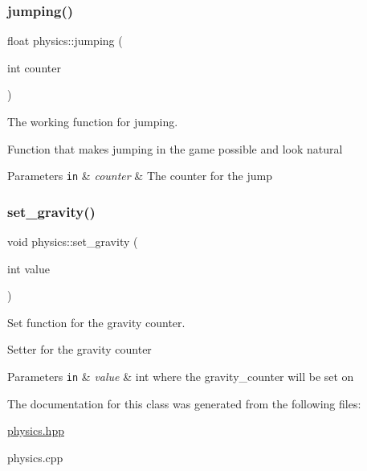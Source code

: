\subsubsection{\texorpdfstring{jumping()}{jumping()}}
{\footnotesize\ttfamily float physics\+::jumping (\begin{DoxyParamCaption}\item[{int}]{counter }\end{DoxyParamCaption})}



The working function for jumping. 

Function that makes jumping in the game possible and look natural


\begin{DoxyParams}[1]{Parameters}
\mbox{\tt in}  & {\em counter} & The counter for the jump \\
\hline
\end{DoxyParams}
\mbox{\label{classphysics_a8b0dff646c304dee3cb5c095d821dc87}} 
\subsubsection{\texorpdfstring{set\+\_\+gravity()}{set\_gravity()}}
{\footnotesize\ttfamily void physics\+::set\+\_\+gravity (\begin{DoxyParamCaption}\item[{int}]{value }\end{DoxyParamCaption})}



Set function for the gravity counter. 

Setter for the gravity counter 
\begin{DoxyParams}[1]{Parameters}
\mbox{\tt in}  & {\em value} & int where the gravity\+\_\+counter will be set on \\
\hline
\end{DoxyParams}


The documentation for this class was generated from the following files\+:\begin{DoxyCompactItemize}
\item 
\hyperlink{physics_8hpp}{physics.\+hpp}\item 
physics.\+cpp\end{DoxyCompactItemize}
